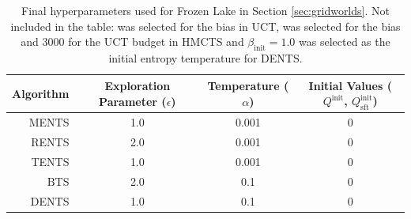         \begin{table}[]
            \centering
            \begin{tabular}{r|ccc} 
                Algorithm   & Exploration Parameter ($\epsilon$)    & Temperature ($\alpha$)    & Initial Values ($Q^{\text{init}}$, $Q^{\text{init}}_{\text{sft}}$)    \\
                \hline
                MENTS       & 1.0                                   & 0.001                     & 0                                                                     \\
                RENTS       & 2.0                                   & 0.001                     & 0                                                                     \\
                TENTS       & 1.0                                   & 0.001                     & 0                                                                     \\
                BTS         & 2.0                                   & 0.1                       & 0                                                                     \\
                DENTS       & 1.0                                   & 0.1                       & 0                                                                     \\
            \end{tabular}
            \caption[Final hyperparameters used for Frozen Lake in Section \ref{sec:gridworlds}]{Final hyperparameters used for Frozen Lake in Section \ref{sec:gridworlds}. Not included in the table: %
             was selected for the bias in UCT, %
              was selected for the bias and 3000 for the UCT budget in HMCTS and $\beta_{\text{init}}=1.0$ was selected as the initial entropy temperature for DENTS. \label{table:hyper_fl}}
        \end{table}
    
